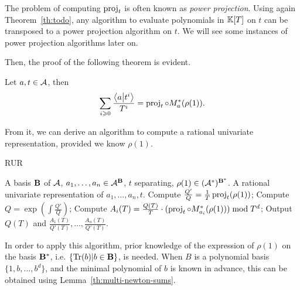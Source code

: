 The problem of computing $\operatorname{proj}_t$ is often known as \emph{power
  projection}. Using again Theorem~\ref{th:todo}, any algorithm to
evaluate polynomials in $\mathbb{K}[T]$ on $t$ can be transposed to a power
projection algorithm on $t$. We will see some instances of power
projection algorithms later on.

Then, the proof of the following theorem is evident.

\begin{theorem}
  \label{th:power-projection}
  Let $a,t\in\mathcal{A}$, then
  \begin{equation}
    \label{eq:56}
    \sum_{i\geqslant0}\frac{\left\langle a \middle| t^i \right\rangle}{T^i} = \operatorname{proj}_t\circ M_a^\ast(\rho(1))
    \text{.}
  \end{equation}
\end{theorem}

From it, we can derive an algorithm to compute a rational univariate
representation, provided we know $\rho(1)$.

\begin{algorithm}
  \label{alg:rur}
  \caption{RUR}
  \begin{algorithmic}[1]
    \REQUIRE A basis $\mathbf{B}$ of
      $\mathcal{A}$, $a_1,\ldots,a_n\in\mathcal{A}^{\mathbf{B}}$, $t$
    separating, $\rho(1)\in(\mathcal{A}^\ast)^{\mathbf{B}^\ast}$.
    \ENSURE A rational univariate representation of $a_1,\ldots,a_n,t$.
    \STATE \label{alg:rur:1}Compute $\frac{Q'}{Q} = \frac{1}{T}\operatorname{proj}_t(\rho(1))$;
    \STATE \label{alg:rur:2}Compute $Q = \exp\left(\int \frac{Q'}{Q}\right)$;
    \STATE \label{alg:rur:4}Compute $A_i(T)=\frac{Q(T)}{T}\cdot(\operatorname{proj}_t\circ M_{a_i}^\ast(\rho(1))) \bmod T^d$;
    \ENDFOR
    \STATE \label{alg:rur:5}Output $Q(T)$ and $\frac{A_1(T)}{Q'(T)},\ldots,\frac{A_n(T)}{Q'(T)}$.
  \end{algorithmic}
\end{algorithm}

In order to apply this algorithm, prior knowledge of the expression of
$\rho(1)$ on the basis $\mathbf{B}^\ast$, i.e. $\{\operatorname{Tr}(b) |
b\in\mathbf{B}\}$, is needed. When $B$ is a polynomial basis
$\{1,b,\ldots,b^d\}$, and the minimal polynomial of $b$ is known in
advance, this can be obtained using Lemma~\ref{th:multi-newton-sums}.

